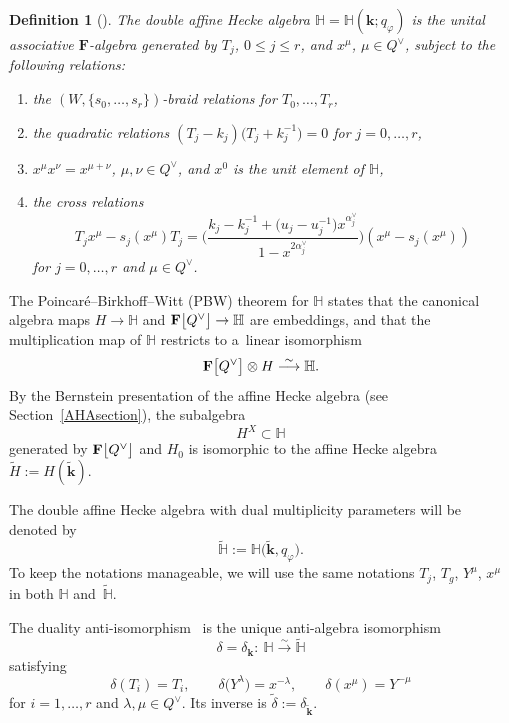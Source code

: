 \documentclass[11pt]{article}
\numberwithin{equation}{section}
\numberwithin{equation}{section}
\newtheorem{Definition}[Theorem]{Definition}
\begin{document}
\begin{Definition}[\cite{ChKZ2,Sa}]
The double affine Hecke algebra $\mathbb{H}=\mathbb{H}(\mathbf{k};q_\varphi)$ is the unital associative $\mathbf{F}$-algebra generated by
$T_j$, $0\leq j\leq r$, and $x^\mu$, $\mu\in Q^\vee$, subject to the following relations:
\begin{enumerate}\itemsep=0pt
\item[(a)] the $(W,\{s_0,\dots,s_r\})$-braid relations for $T_0,\dots,T_r$,
\item[(b)] the quadratic relations $(T_j-k_j)\bigl(T_j+k_j^{-1}\bigr)=0$ for $j=0,\dots,r$,
\item[(c)] $x^\mu x^\nu=x^{\mu+\nu}$, $\mu,\nu\in Q^\vee$, and $x^0$ is the unit element of $\mathbb{H}$,
\item[(d)] the cross relations
\begin{equation}\label{crossX}
T_jx^\mu-s_j(x^\mu)T_j=\Biggl(\frac{k_j-k_j^{-1}+\bigl(u_j-u_j^{-1}\bigr)x^{\alpha_j^\vee}}{1-x^{2\alpha_j^\vee}}\Biggr)(x^\mu-s_j(x^\mu))
\end{equation}
for $j=0,\dots,r$ and $\mu\in Q^\vee$.
\end{enumerate}
\end{Definition}
The Poincar{\'e}--Birkhoff--Witt (PBW) theorem for $\mathbb{H}$ states that the canonical algebra maps $H\rightarrow \mathbb{H}$ and $\mathbf{F}\smash{\bigl[Q^\vee\bigr]}\rightarrow
\mathbb{H}$
are embeddings, and that
the multiplication map of $\mathbb{H}$ restricts to a~linear isomorphism
\[
\mathbf{F}\smash{\bigl[Q^\vee\bigr]}\otimes H\overset{\sim}{\longrightarrow} \mathbb{H}.
\]
By the Bernstein presentation of the affine Hecke algebra (see Section~\ref{AHAsection}), the subalgebra
\[
H^X\subset\mathbb{H}
\]
generated by $\mathbf{F}\smash{\bigl[Q^\vee\bigr]}$ and $H_0$ is isomorphic to the affine Hecke algebra $\widetilde{H}:=H(\widetilde{\mathbf{k}})$.

The double affine Hecke algebra with dual multiplicity parameters will be denoted by
\[
\widetilde{\mathbb{H}}:=\mathbb{H}\bigl(\widetilde{\mathbf{k}},q_\varphi\bigr).
\]
To keep the notations manageable, we will use the same notations $T_j$, $T_g$, $Y^\mu$, $x^\mu$ in both $\mathbb{H}$ and~$\widetilde{\mathbb{H}}$.

The duality anti-isomorphism~\cite{ChBook,Sa} is the unique anti-algebra isomorphism
\[
\delta=\delta_{\mathbf{k}}\colon\ \mathbb{H}\overset{\sim}{\longrightarrow}\widetilde{\mathbb{H}}
\]
satisfying
\[
\delta(T_i)=T_i,\qquad \delta\bigl(Y^\lambda\bigr)=x^{-\lambda},\qquad \delta(x^\mu)=Y^{-\mu}
\]
for $i=1,\dots,r$ and $\lambda,\mu\in Q^\vee$. Its inverse is $\widetilde{\delta}:=\delta_{\widetilde{\mathbf{k}}}$.
\end{document}
